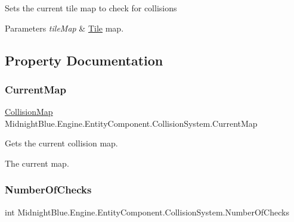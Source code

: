 Sets the current tile map to check for collisions 


\begin{DoxyParams}{Parameters}
{\em tile\+Map} & \hyperlink{class_midnight_blue_1_1_tile}{Tile} map.\\
\hline
\end{DoxyParams}


\subsection{Property Documentation}
\hypertarget{class_midnight_blue_1_1_engine_1_1_entity_component_1_1_collision_system_a7467afd10338c1c475442d49d3ba0652}{}\label{class_midnight_blue_1_1_engine_1_1_entity_component_1_1_collision_system_a7467afd10338c1c475442d49d3ba0652} 
\subsubsection{\texorpdfstring{Current\+Map}{CurrentMap}}
{\footnotesize\ttfamily \hyperlink{class_midnight_blue_1_1_engine_1_1_collision_1_1_collision_map}{Collision\+Map} Midnight\+Blue.\+Engine.\+Entity\+Component.\+Collision\+System.\+Current\+Map\hspace{0.3cm}{\ttfamily [get]}}



Gets the current collision map. 

The current map.\hypertarget{class_midnight_blue_1_1_engine_1_1_entity_component_1_1_collision_system_a0375b2432a276123371e5616c51df971}{}\label{class_midnight_blue_1_1_engine_1_1_entity_component_1_1_collision_system_a0375b2432a276123371e5616c51df971} 
\subsubsection{\texorpdfstring{Number\+Of\+Checks}{NumberOfChecks}}
{\footnotesize\ttfamily int Midnight\+Blue.\+Engine.\+Entity\+Component.\+Collision\+System.\+Number\+Of\+Checks\hspace{0.3cm}{\ttfamily [get]}}



